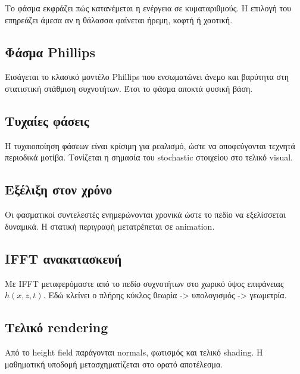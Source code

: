 \documentclass[
  a4paper,
  11pt,
]{article}
\begin{document}
Το φάσμα εκφράζει πώς κατανέμεται η ενέργεια σε κυματαριθμούς. Η επιλογή
του επηρεάζει άμεσα αν η θάλασσα φαίνεται ήρεμη, κοφτή ή χαοτική.

\subsection{Φάσμα Phillips}\label{ux3c6ux3acux3c3ux3bcux3b1-phillips}

Εισάγεται το κλασικό μοντέλο Phillips που ενσωματώνει άνεμο και βαρύτητα
στη στατιστική στάθμιση συχνοτήτων. Έτσι το φάσμα αποκτά φυσική βάση.

\subsection{Τυχαίες
φάσεις}\label{ux3c4ux3c5ux3c7ux3b1ux3afux3b5ux3c2-ux3c6ux3acux3c3ux3b5ux3b9ux3c2}

Η τυχαιοποίηση φάσεων είναι κρίσιμη για ρεαλισμό, ώστε να αποφεύγονται
τεχνητά περιοδικά μοτίβα. Τονίζεται η σημασία του stochastic στοιχείου
στο τελικό visual.

\subsection{Εξέλιξη στον
χρόνο}\label{ux3b5ux3beux3adux3bbux3b9ux3beux3b7-ux3c3ux3c4ux3bfux3bd-ux3c7ux3c1ux3ccux3bdux3bf}

Οι φασματικοί συντελεστές ενημερώνονται χρονικά ώστε το πεδίο να
εξελίσσεται δυναμικά. Η στατική περιγραφή μετατρέπεται σε animation.

\subsection{IFFT
ανακατασκευή}\label{ifft-ux3b1ux3bdux3b1ux3baux3b1ux3c4ux3b1ux3c3ux3baux3b5ux3c5ux3ae}

Με IFFT μεταφερόμαστε από το πεδίο συχνοτήτων στο χωρικό ύψος επιφάνειας
\(h(x,z,t)\). Εδώ κλείνει ο πλήρης κύκλος θεωρία -\textgreater{}
υπολογισμός -\textgreater{} γεωμετρία.

\subsection{Τελικό
rendering}\label{ux3c4ux3b5ux3bbux3b9ux3baux3cc-rendering}

Από το height field παράγονται normals, φωτισμός και τελικό shading. Η
μαθηματική υποδομή μετασχηματίζεται στο ορατό αποτέλεσμα.
\end{document}
